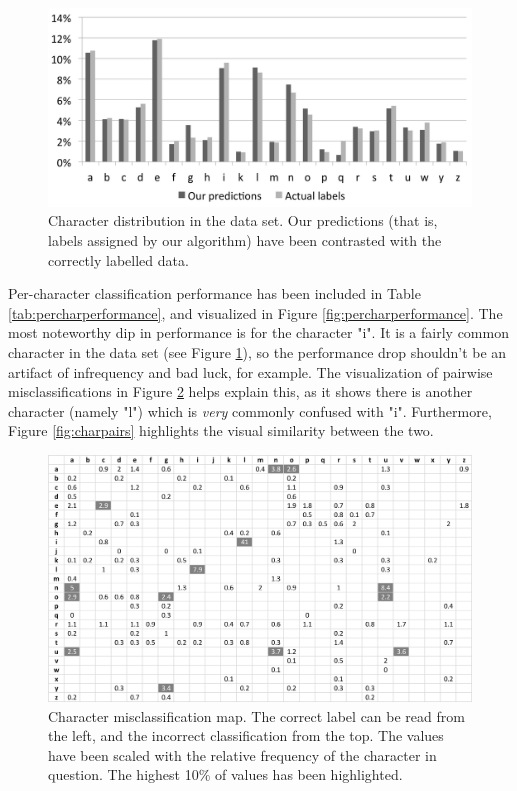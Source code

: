 \documentclass{netsec2012}
\begin{document}
\begin{figure}[t]
\centering
\includegraphics[width=120mm]{chardist.png}
\caption{Character distribution in the data set.  Our predictions (that is, labels assigned by our
algorithm) have been contrasted with the correctly labelled data.}
\label{fig:chardistribution}
\end{figure}

Per-character classification performance has been included in Table \ref{tab:percharperformance},
and visualized in Figure \ref{fig:percharperformance}.  The most noteworthy dip in performance is
for the character "i".  It is a fairly common character in the data set (see Figure
\ref{fig:chardistribution}), so the performance drop shouldn't be an artifact of infrequency and bad
luck, for example.  The visualization of pairwise misclassifications in Figure
\ref{fig:charmisclassifications} helps explain this, as it shows there is another character (namely
"l") which is \emph{very} commonly confused with "i".  Furthermore, Figure \ref{fig:charpairs}
highlights the visual similarity between the two.

\begin{figure}[t]
\centering
\includegraphics[width=135mm]{charmap.png}
\caption{Character misclassification map.  The correct label can be read from the left, and the
incorrect classification from the top.  The values have been scaled with the relative frequency of
the character in question.  The highest 10\% of values has been highlighted.}
\label{fig:charmisclassifications}
\end{figure}
\end{document}
